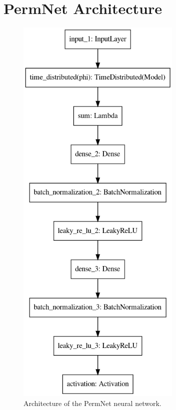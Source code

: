 \FloatBarrier
\section{PermNet Architecture}

\begin{figure}
  \centerfloat
  \includegraphics[width=0.7\textwidth]{figures/quarks/TensorFlow_model.png}
  \caption[PermNet Architecture]
          {Architecture of the PermNet neural network. } 
  \label{fig:q:permnet_architecture}
\end{figure}
\clearpage


